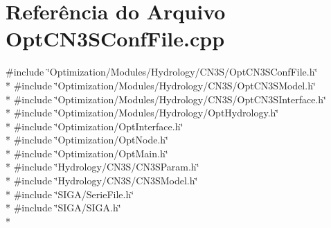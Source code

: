 \section{Referência do Arquivo Opt\+C\+N3\+S\+Conf\+File.\+cpp}
\label{_opt_c_n3_s_conf_file_8cpp}
{\ttfamily \#include \char`\"{}Optimization/\+Modules/\+Hydrology/\+C\+N3\+S/\+Opt\+C\+N3\+S\+Conf\+File.\+h\char`\"{}}\\*
{\ttfamily \#include \char`\"{}Optimization/\+Modules/\+Hydrology/\+C\+N3\+S/\+Opt\+C\+N3\+S\+Model.\+h\char`\"{}}\\*
{\ttfamily \#include \char`\"{}Optimization/\+Modules/\+Hydrology/\+C\+N3\+S/\+Opt\+C\+N3\+S\+Interface.\+h\char`\"{}}\\*
{\ttfamily \#include \char`\"{}Optimization/\+Modules/\+Hydrology/\+Opt\+Hydrology.\+h\char`\"{}}\\*
{\ttfamily \#include \char`\"{}Optimization/\+Opt\+Interface.\+h\char`\"{}}\\*
{\ttfamily \#include \char`\"{}Optimization/\+Opt\+Node.\+h\char`\"{}}\\*
{\ttfamily \#include \char`\"{}Optimization/\+Opt\+Main.\+h\char`\"{}}\\*
{\ttfamily \#include \char`\"{}Hydrology/\+C\+N3\+S/\+C\+N3\+S\+Param.\+h\char`\"{}}\\*
{\ttfamily \#include \char`\"{}Hydrology/\+C\+N3\+S/\+C\+N3\+S\+Model.\+h\char`\"{}}\\*
{\ttfamily \#include \char`\"{}S\+I\+G\+A/\+Serie\+File.\+h\char`\"{}}\\*
{\ttfamily \#include \char`\"{}S\+I\+G\+A/\+S\+I\+G\+A.\+h\char`\"{}}\\*
